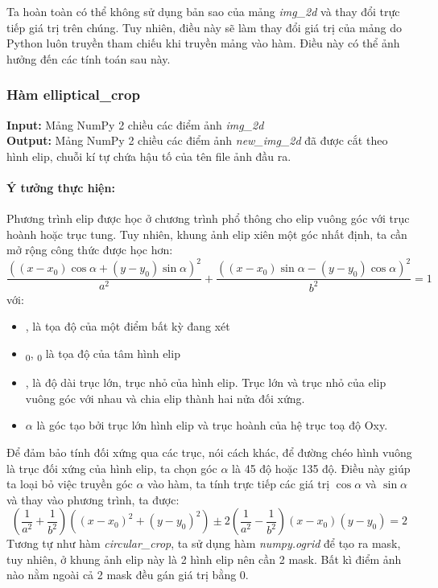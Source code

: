 \documentclass{article}
\begin{document}
Ta hoàn toàn có thể không sử dụng bản sao của mảng \textit{img\_2d} và thay đổi trực tiếp giá trị trên chúng. Tuy nhiên, điều này sẽ làm thay đổi giá trị của mảng do Python luôn truyền tham chiếu khi truyền mảng vào hàm. Điều này có thể ảnh hưởng đến các tính toán sau này.

\subsubsection{Hàm elliptical\_crop}
\textbf{Input:} Mảng NumPy 2 chiều các điểm ảnh \textit{img\_2d} \\
\textbf{Output:} Mảng NumPy 2 chiều các điểm ảnh \textit{new\_img\_2d} đã được cắt theo hình elip, chuỗi kí tự chứa hậu tố của tên file ảnh đầu ra.
\paragraph{Ý tưởng thực hiện:} Phương trình elip được học ở chương trình phổ thông cho elip vuông góc với trục hoành hoặc trục tung. Tuy nhiên, khung ảnh elip xiên một góc nhất định, ta cần mở rộng công thức được học hơn:
\[ \frac{((x-x_0)\cos \alpha + (y-y_0) \sin \alpha)^2}{a^2} + \frac{((x-x_0)\sin \alpha - (y-y_0) \cos \alpha)^2}{b^2}= 1 \]
với:
\begin{itemize}
  \item {},  là tọa độ của một điểm bất kỳ đang xét
  \item {}\textsubscript 0, \textsubscript 0 là tọa độ của tâm hình elip
  \item {},  là độ dài trục lớn, trục nhỏ của hình elip. Trục lớn và trục nhỏ của elip vuông góc với nhau và chia elip thành hai nửa đối xứng.
  \item $\alpha$ là góc tạo bởi trục lớn hình elip và trục hoành của hệ trục toạ độ Oxy.
\end{itemize}
Để đảm bảo tính đối xứng qua các trục, nói cách khác, để đường chéo hình vuông là trục đối xứng của hình elip, ta chọn góc $\alpha$ là 45 độ hoặc 135 độ. Điều này giúp ta loại bỏ việc truyền góc $\alpha$ vào hàm, ta tính trực tiếp các giá trị $\cos \alpha$ và $\sin \alpha$ và thay vào phương trình, ta được:
\begin{equation}
  (\frac{1}{a^2} + \frac{1}{b^2})((x-x_0)^2 + (y-y_0)^2) \pm 2(\frac{1}{a^2} - \frac{1}{b^2})(x-x_0) (y-y_0) = 2
  \label{eq:elip}
\end{equation}
Tương tự như hàm \textit{circular\_crop}, ta sử dụng hàm \textit{numpy.ogrid} để tạo ra mask, tuy nhiên, ở khung ảnh elip này là 2 hình elip nên cần 2 mask. Bất kì điểm ảnh nào nằm ngoài cả 2 mask đều gán giá trị bằng 0.\\
\end{document}
